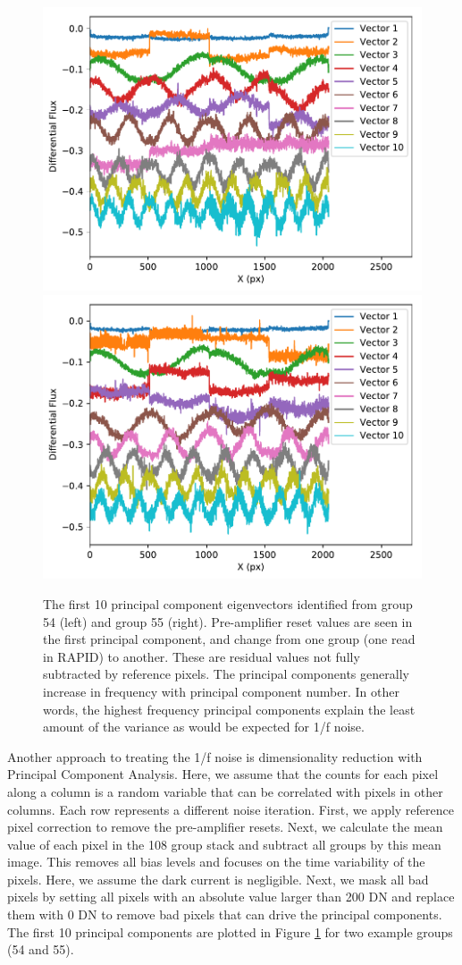 \documentclass{aastex62}
\begin{document}
\begin{figure}[!hbtp]
\centering
\includegraphics[width=.4\columnwidth]{pca_dark_amp_all_extra_bias_sub_grp_54.pdf}
\includegraphics[width=.4\columnwidth]{pca_dark_amp_all_extra_bias_sub_grp_55.pdf}
\caption{The first 10 principal component eigenvectors identified from group 54 (left) and group 55 (right).
Pre-amplifier reset values are seen in the first principal component, and change from one group (one read in RAPID) to another.
These are residual values not fully subtracted by reference pixels.
The principal components generally increase in frequency with principal component number.
In other words, the highest frequency principal components explain the least amount of the variance as would be expected for 1/f noise.
}\label{fig:pcaEigenvectors}
\end{figure}

Another approach to treating the 1/f noise is dimensionality reduction with Principal Component Analysis.
Here, we assume that the counts for each pixel along a column is a random variable that can be correlated with pixels in other columns.
Each row represents a different noise iteration.
First, we apply reference pixel correction to remove the pre-amplifier resets.
Next, we calculate the mean value of each pixel in the 108 group stack and subtract all groups by this mean image.
This removes all bias levels and focuses on the time variability of the pixels.
Here, we assume the dark current is negligible.
Next, we mask all bad pixels by setting all pixels with an absolute value larger than 200 DN and replace them with 0 DN to remove bad pixels that can drive the principal components.
The first 10 principal components are plotted in Figure \ref{fig:pcaEigenvectors} for two example groups (54 and 55).
\end{document}
